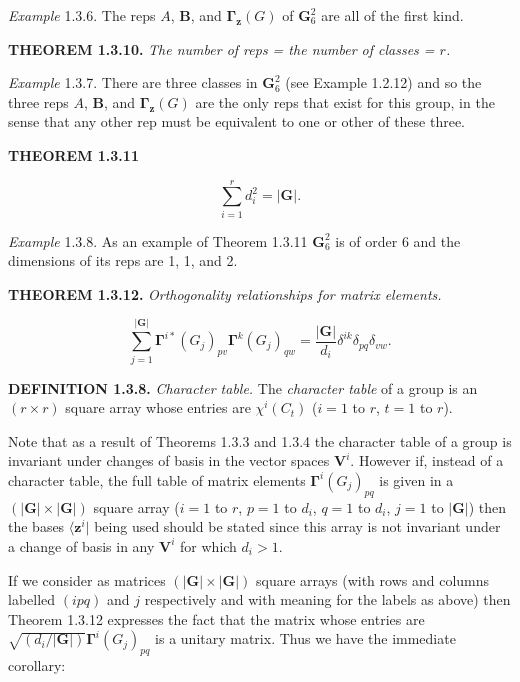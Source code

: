 \documentclass[11pt,a4paper,twoside,openright]{book}
\begin{document}
\textit{Example} 1.3.6. The reps $A$, $\mathbf{B}$, and $\boldsymbol{\Gamma}_{\mathbf{z}}(G)$ of $\mathbf{G}_6^2$ are all of the first kind.

\textbf{THEOREM 1.3.10.} \textit{The number of reps = the number of classes = $r$.}

\textit{Example} 1.3.7. There are three classes in $\mathbf{G}_6^2$ (see Example 1.2.12) and so the three reps $A$, $\mathbf{B}$, and $\boldsymbol{\Gamma}_{\mathbf{z}}(G)$ are the only reps that exist for this group, in the sense that any other rep must be equivalent to one or other of these three.

\textbf{THEOREM 1.3.11}

\begin{equation*}
\sum_{i=1}^{r} d_{i}^{2} = |\mathbf{G}|. \tag{1.3.13}
\end{equation*}

\textit{Example} 1.3.8. As an example of Theorem 1.3.11 $\mathbf{G}_6^2$ is of order 6 and the dimensions of its reps are 1, 1, and 2.

\textbf{THEOREM 1.3.12.} \textit{Orthogonality relationships for matrix elements.}

\begin{equation*}
\sum_{j=1}^{|\mathbf{G}|} \boldsymbol{\Gamma}^{i*}(G_{j})_{pv}\boldsymbol{\Gamma}^{k}(G_{j})_{qw} = \frac{|\mathbf{G}|}{d_{i}}\delta^{ik}\delta_{pq}\delta_{vw}. \tag{1.3.14}
\end{equation*}

\textbf{DEFINITION 1.3.8.} \textit{Character table.} The \textit{character table} of a group is an $(r \times r)$ square array whose entries are $\chi^{i}(C_{t})$ ($i = 1$ to $r$, $t = 1$ to $r$).

Note that as a result of Theorems 1.3.3 and 1.3.4 the character table of a group is invariant under changes of basis in the vector spaces $\mathbf{V}^{i}$. However if, instead of a character table, the full table of matrix elements $\boldsymbol{\Gamma}^{i}(G_{j})_{pq}$ is given in a $(|\mathbf{G}| \times |\mathbf{G}|)$ square array ($i = 1$ to $r$, $p = 1$ to $d_{i}$, $q = 1$ to $d_{i}$, $j = 1$ to $|\mathbf{G}|$) then the bases $\langle \mathbf{z}^{i}|$ being used should be stated since this array is not invariant under a change of basis in any $\mathbf{V}^{i}$ for which $d_{i} > 1$.

If we consider as matrices $(|\mathbf{G}| \times |\mathbf{G}|)$ square arrays (with rows and columns labelled $(ipq)$ and $j$ respectively and with meaning for the labels as above) then Theorem 1.3.12 expresses the fact that the matrix whose entries are $\sqrt{(d_{i}/|\mathbf{G}|)}\boldsymbol{\Gamma}^{i}(G_{j})_{pq}$ is a unitary matrix. Thus we have the immediate corollary:
\end{document}
